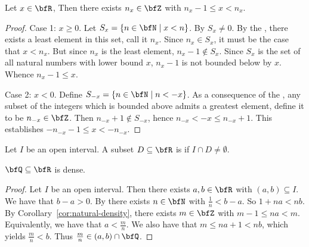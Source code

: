     \begin{corollary}\label{cor:natural-density}
        Let $x \in \bfR$, Then there exists $n_x \in \bfZ$ with $n_x - 1 \leq x < n_x$.
    \end{corollary}
        \begin{proof}
            Case 1: $x \geq 0$. Let $S_x = \{n \in \bfN \mid x < n\}$. By  $S_x \neq 0$. By the , there exists a least element in this set, call it $n_x$. Since $n_x \in S_x$, it must be the case that $x < n_x$. But since $n_x$ is the least element, $n_x - 1 \not\in S_x$. Since $S_x$ is the set of all natural numbers with lower bound $x$, $n_x - 1$ is not bounded below by $x$. Whence $n_x - 1 \leq x$.

            Case 2: $x <0$. Define $S_{-x} = \{n \in \bfN \mid n < -x\}$. As a consequence of the , any subset of the integers which is bounded above admits a greatest element, define it to be $n_{-x} \in \bfZ$. Then $n_{-x} + 1 \not\in S_{-x}$, hence $n_{-x} < -x \leq n_{-x} + 1$. This establishes $-n_{-x} - 1 \leq x < -n_{-x}$.
        \end{proof}

    \begin{definition}
        Let $I$ be an open interval. A subset $D \subseteq \bfR$ is  if $I \cap D \neq \emptyset$.
    \end{definition}

    \begin{theorem}\label{thm:density-of-q}
        $\bfQ \subseteq \bfR$ is dense.
    \end{theorem}
        \begin{proof}
            Let $I$ be an open interval. Then there exists $a,b \in \bfR$ with $(a,b) \subseteq I$. We have that $b - a > 0$. By  there exists $n \in \bfN$ with $\frac{1}{n} < b-a$. So $1 + na < nb$. By Corollary~\ref{cor:natural-density}, there exists $m \in \bfZ$ with $m-1 \leq na < m$. Equivalently, we have that $a < \frac{m}{n}$. We also have that $m \leq na + 1 < nb$, which yields $\frac{m}{n} < b$. Thus $\frac{m}{n} \in (a,b) \cap \bfQ$.
        \end{proof}

